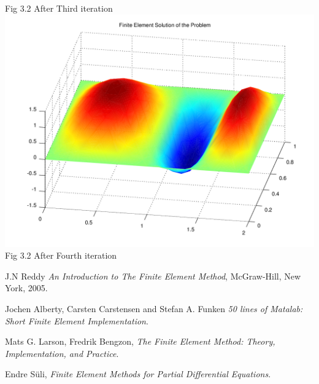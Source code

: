 \documentclass{report}
\numberwithin{equation}{chapter}
\begin{document}
\begin{center}
{Fig 3.2 After Third iteration}
\includegraphics[scale=0.58]{44}\hspace*{70cm}
{Fig 3.2 After Fourth iteration}
\end{center}


\newpage
\begin{thebibliography}{9}
 J.N Reddy \emph{An Introduction to The Finite Element Method}, McGraw-Hill, New York, 2005.


Jochen Alberty, Carsten Carstensen and Stefan A. Funken \emph{50 lines of Matalab: Short Finite Element Implementation}.

 Mats G. Larson, Fredrik Bengzon, \emph{The Finite Element Method:
Theory, Implementation, and Practice}.

 Endre S\"{u}li, \emph{Finite Element Methods for Partial
Differential Equations}.

\end{thebibliography}
\end{document}
